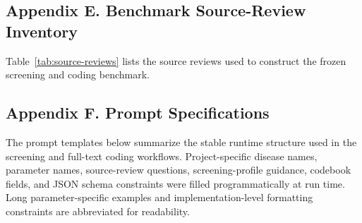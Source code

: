 

\clearpage

{}
\subsection*{Appendix E. Benchmark Source-Review Inventory}

Table~\ref{tab:source-reviews} lists the source reviews used to construct the frozen screening and coding benchmark.


\clearpage

{}
\subsection*{Appendix F. Prompt Specifications}

The prompt templates below summarize the stable runtime structure used in the screening and full-text coding workflows. Project-specific disease names, parameter names, source-review questions, screening-profile guidance, codebook fields, and JSON schema constraints were filled programmatically at run time. Long parameter-specific examples and implementation-level formatting constraints are abbreviated for readability.

